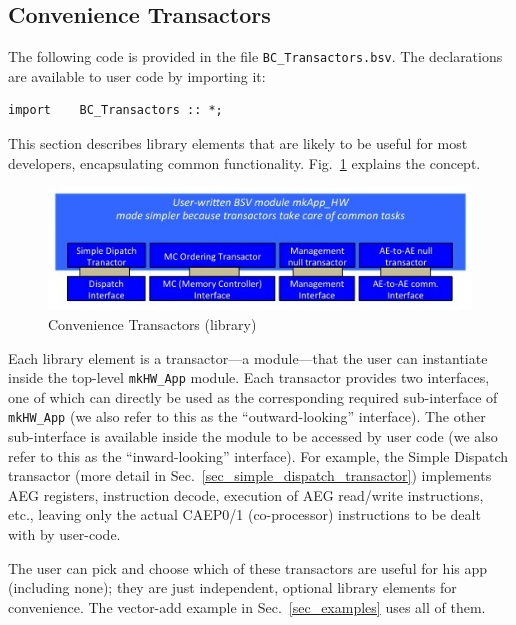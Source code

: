 \documentclass[twoside,letterpaper,11pt]{article}
\begin{document}

\subsection{Convenience Transactors}

\label{sec_transactors}

The following code is provided in the file \verb|BC_Transactors.bsv|.
The declarations are available to user code by importing it:
\begin{Verbatim}[frame=single]
import    BC_Transactors :: *;
\end{Verbatim}

This section describes library elements that are likely to be useful
for most developers, encapsulating common functionality.
Fig.~\ref{Fig_transactors} explains the concept.
\begin{figure}[htbp]
  \centerline{\includegraphics[width=5in,angle=0]{Figures/Fig_transactors}}
  \caption{\label{Fig_transactors}Convenience Transactors (library)}
\end{figure}
Each library element is a transactor---a module---that the user can
instantiate inside the top-level \verb|mkHW_App| module.  Each
transactor provides two interfaces, one of which can directly be used
as the corresponding required sub-interface of \verb|mkHW_App| (we
also refer to this as the ``outward-looking'' interface).  The other
sub-interface is available inside the module to be accessed by user
code (we also refer to this as the ``inward-looking'' interface).  For
example, the Simple Dispatch transactor (more detail in
Sec.~\ref{sec_simple_dispatch_transactor}) implements AEG registers,
instruction decode, execution of AEG read/write instructions, etc.,
leaving only the actual CAEP0/1 (co-processor)
instructions to be dealt with by user-code.

The user can pick and choose which of these transactors are useful for
his app (including none); they are just independent, optional library
elements for convenience.  The vector-add example in
Sec.~\ref{sec_examples} uses all of them.
\end{document}
